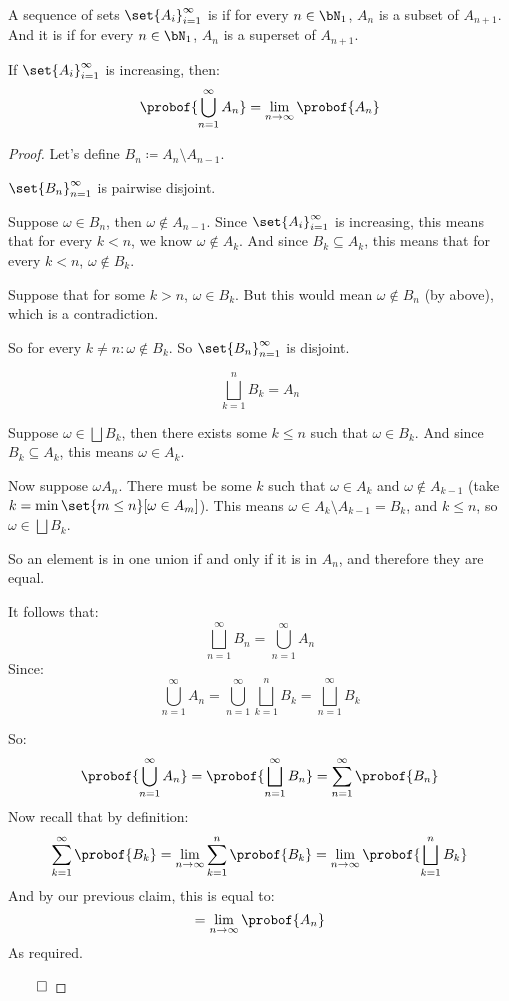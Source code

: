 \begin{defn*}

	A sequence of sets $\set{A_i}_{i=1}^\infty$ is  if for every $n\in\bN_1$, $A_n$ is a subset of $A_{n+1}$.
	And it is  if for every $n\in\bN_1$, $A_n$ is a superset of $A_{n+1}$.

\end{defn*}

\begin{thrm*}[contProbTheorem]

	If $\set{A_i}_{i=1}^\infty$ is increasing, then:
	\[ \probof{\bigcup_{n=1}^\infty A_n} = \lim_{n\to\infty}\probof{A_n} \]

\end{thrm*}

\begin{proof}

	Let's define $B_n\coloneqq A_n\setminus A_{n-1}$.

	\begin{claim}
		$\set{B_n}_{n=1}^\infty$ is pairwise disjoint.

		Suppose $\omega\in B_n$, then $\omega\notin A_{n-1}$.
		Since $\set{A_i}_{i=1}^\infty$ is increasing, this means that for every $k<n$, we know $\omega\notin A_k$.
		And since $B_k\subseteq A_k$, this means that for every $k<n$, $\omega\notin B_k$.

		Suppose that for some $k>n$, $\omega\in B_k$. But this would mean $\omega\notin B_n$ (by above), which is a contradiction.

		So for every $k\neq n: \omega\notin B_k$.
		So $\set{B_n}_{n=1}^\infty$ is disjoint.
	\end{claim}

	\begin{claim}
		\[ \bigsqcup_{k=1}^n B_k = A_n \]

		Suppose $\omega\in\bigsqcup B_k$, then there exists some $k\leq n$ such that $\omega\in B_k$.
		And since $B_k\subseteq A_k$, this means $\omega\in A_k$.

		Now suppose $\omega A_n$.
		There must be some $k$ such that $\omega\in A_k$ and $\omega\notin A_{k-1}$
		(take $k=\min\set{m\leq n}[\omega\in A_m]$).
		This means $\omega\in A_k\setminus A_{k-1}=B_k$, and $k\leq n$, so $\omega\in\bigsqcup B_k$.

		So an element is in one union if and only if it is in $A_n$, and therefore they are equal.
	\end{claim}

	It follows that:
	\[ \bigsqcup_{n=1}^\infty B_n = \bigcup_{n=1}^\infty A_n \]
	Since:
	\[ \bigcup_{n=1}^\infty A_n = \bigcup_{n=1}^\infty \bigsqcup_{k=1}^n B_k = \bigsqcup_{n=1}^\infty B_k \]

	So:
	\[ \probof{\bigcup_{n=1}^\infty A_n} = \probof{\bigsqcup_{n=1}^\infty B_n} = \sum_{n=1}^\infty \probof{B_n} \]
	Now recall that by definition:
	\[ \sum_{k=1}^\infty\probof{B_k} = \lim_{n\to\infty}\sum_{k=1}^n\probof{B_k} = \lim_{n\to\infty}\probof{\bigsqcup_{k=1}^n B_k} \]
	And by our previous claim, this is equal to:
	\[ = \lim_{n\to\infty}\probof{A_n} \]
	As required.

\hfill$\qed$

\end{proof}

